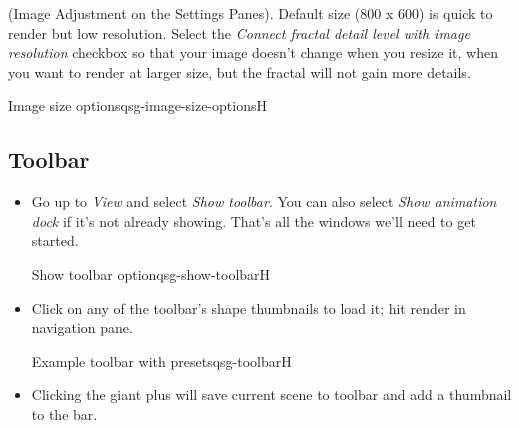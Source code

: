(Image Adjustment on the Settings Panes). Default size (800 x 600) is quick to render but low resolution. Select the \emph{Connect fractal detail level with image resolution} checkbox so that your image doesn’t change when you resize it, when you want to render at larger size, but the fractal will not gain more details. 

{Image size options}{qsg-image-size-options}{H}

\subsection{Toolbar}\label{qsg-toolbar}


\begin{itemize}
	\item Go up to \emph{View} and select \emph{Show toolbar}. You can also select \emph{Show animation dock} if it’s not already showing. That’s all the windows we’ll need to get started.
	
	{Show toolbar option}{qsg-show-toolbar}{H}
	
    \item Click on any of the toolbar’s shape thumbnails to load it; hit render in navigation pane.
    
    {Example toolbar with presets}{qsg-toolbar}{H}
    
    \item Clicking the giant plus will save current scene to toolbar and add a thumbnail to the bar. 
\end{itemize}

